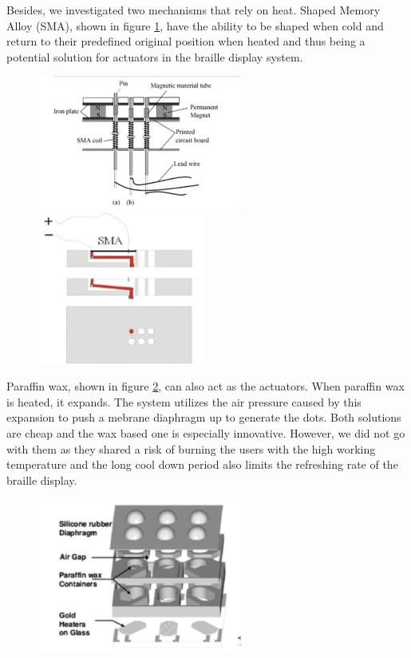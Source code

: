 Besides, we investigated two mechanisms that rely on heat. Shaped Memory Alloy (SMA), shown in figure \ref{fig:sma}, have the ability to be shaped when cold and return to their predefined original position when heated and thus being a potential solution for actuators in the braille display system.
\begin{figure}\centering
    \includegraphics[width=0.6\textwidth]{figures/sma-coil.png}
    \includegraphics[height=5cm]{figures/sma-mechanism.png}
\caption{}
\label{fig:sma}
\end{figure}

Paraffin wax, shown in figure \ref{fig:paraffin}, can also act as the actuators. When paraffin wax is heated, it expands. The system utilizes the air pressure caused by this expansion to push a mebrane diaphragm up to generate the dots. Both solutions are cheap and the wax based one is especially innovative. However, we did not go with them as they shared a risk of burning the users with the high working temperature and the long cool down period also limits the refreshing rate of the braille display.
\begin{figure} \centering
    \includegraphics[width=0.6\textwidth]{figures/paraffin.png}
\caption{}
\label{fig:paraffin}
\end{figure}
